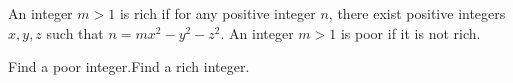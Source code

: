 An integer $m>1$ is rich if for any positive integer $n$,  there exist positive integers $x,y,z$ such that $n=mx^2-y^2-z^2$. An integer $m>1$ is poor if it is not rich.

Find a poor integer.Find a rich integer.